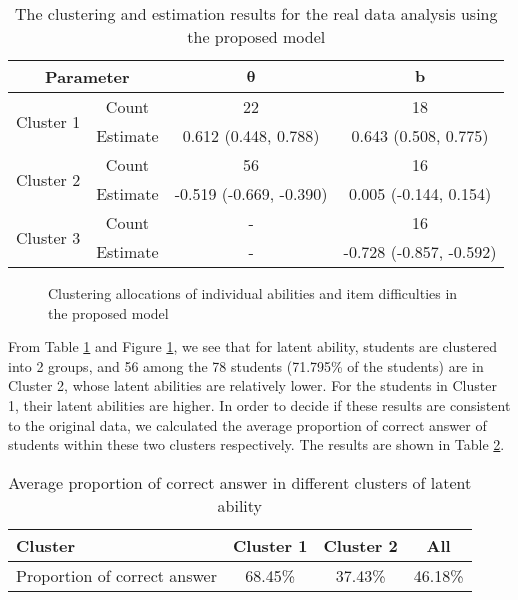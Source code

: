 \documentclass[12pt]{article}
\begin{document}
\begin{table}[h!]
	\centering
	\caption{The clustering and estimation results for the real data analysis using the proposed model }\label{tab:clusterres}
	\begin{tabular}{lccc}
		\toprule
		\multicolumn{2}{c}{Parameter} & $\bm{\theta}$ &  $\bm{b}$ \\
		\midrule 
	     \multirow{2}{*}{Cluster 1} & Count  & 22 & 18  \\
		 & Estimate & 0.612 (0.448, 0.788) &0.643 (0.508, 0.775)\\
		 \midrule
		 \multirow{2}{*}{Cluster 2} & Count  &56 & 16\\
		& Estimate &  -0.519 (-0.669, -0.390) &0.005 (-0.144, 0.154) \\
		\midrule
		 \multirow{2}{*}{Cluster 3} & Count  &- & 16 \\
		& Estimate &-&  -0.728 (-0.857, -0.592) \\
		\bottomrule
	\end{tabular}
\end{table} 

\begin{figure}[h!] 
	\centering  
	\caption{Clustering allocations of individual abilities and item difficulties in the proposed model
		\label{fig:new_res} }
\end{figure}

From Table \ref{tab:clusterres} and Figure \ref{fig:new_res}, we see that for latent ability, students are clustered into 2 groups, and 56 among the 78 students  (71.795\% of the students) are in Cluster 2, whose latent abilities are relatively lower. For the students in Cluster 1, their latent abilities are higher. In order to decide if these results are consistent to the original data, we calculated the average proportion of correct answer of students within these two clusters respectively. The results are shown in Table \ref{tab:ratio}.

\begin{table}[h!]
	\centering
	\caption{Average proportion of correct answer in different clusters of latent ability}\label{tab:ratio}
	\begin{tabular}{lccc}
		\toprule
		Cluster  &  Cluster 1 & Cluster 2 & All \\
		\midrule 
		Proportion of correct answer & 68.45\% & 37.43\% & 46.18\%  \\
		\bottomrule
	\end{tabular}
\end{table} 
\end{document}
